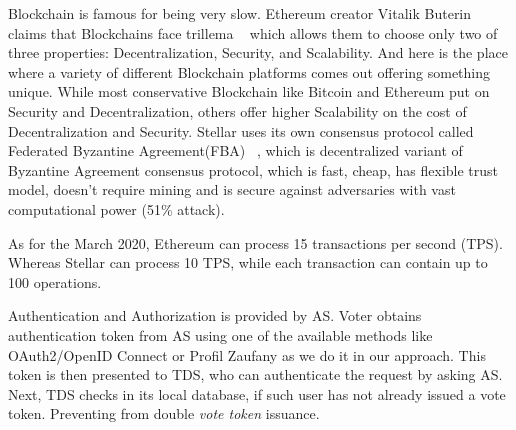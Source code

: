 \documentclass[runningheads]{llncs}
\begin{document}


Blockchain is famous for being very slow. Ethereum creator Vitalik Buterin claims that Blockchains face trillema ~\cite{ethereum} which allows them to choose only two of three properties: Decentralization, Security, and Scalability. 
And here is the place where a variety of different Blockchain platforms comes out offering something unique. While most conservative Blockchain like Bitcoin and Ethereum put on Security and Decentralization, others offer higher Scalability on the cost of Decentralization and Security. Stellar uses its own consensus protocol called Federated Byzantine Agreement(FBA) ~\cite{mazieres2015stellar}, which is decentralized variant of Byzantine Agreement consensus protocol, which is fast, cheap, has flexible trust model, doesn't require mining and is secure against adversaries with vast computational power (51\% attack).



As for the March 2020, Ethereum can process 15 transactions per second (TPS). Whereas Stellar can process 10 TPS, while each transaction can contain up to 100 operations.

Authentication and Authorization is provided by AS.
Voter obtains authentication token from AS using one of the available methods like OAuth2/OpenID Connect or Profil Zaufany 
as we do it in our approach. 
This token is then presented to TDS, who can authenticate the request by asking AS. Next, TDS checks in its local database, if such user has not already issued a vote token. Preventing from double \textit{vote token} issuance.
\end{document}
